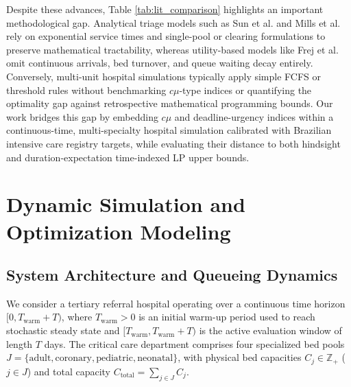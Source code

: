 \documentclass[final,5p,times,twocolumn]{elsarticle}
\begin{document}
Despite these advances, Table \ref{tab:lit_comparison} highlights an important methodological gap. Analytical triage models such as Sun et al. \cite{sun2018patient} and Mills et al. \cite{mills2013resource} rely on exponential service times and single-pool or clearing formulations to preserve mathematical tractability, whereas utility-based models like Frej et al. \cite{Frej_2023} omit continuous arrivals, bed turnover, and queue waiting decay entirely. Conversely, multi-unit hospital simulations typically apply simple FCFS or threshold rules without benchmarking $c\mu$-type indices or quantifying the optimality gap against retrospective mathematical programming bounds. Our work bridges this gap by embedding $c\mu$ and deadline-urgency indices within a continuous-time, multi-specialty hospital simulation calibrated with Brazilian intensive care registry targets, while evaluating their distance to both hindsight and duration-expectation time-indexed LP upper bounds.

\section{Dynamic Simulation and Optimization Modeling}
\label{sec:modeling}

\subsection{System Architecture and Queueing Dynamics}

We consider a tertiary referral hospital operating over a continuous time horizon $[0, T_{\text{warm}} + T)$, where $T_{\text{warm}} > 0$ is an initial warm-up period used to reach stochastic steady state and $[T_{\text{warm}}, T_{\text{warm}} + T)$ is the active evaluation window of length $T$ days. The critical care department comprises four specialized bed pools $J = \{\text{adult}, \text{coronary}, \text{pediatric}, \text{neonatal}\}$, with physical bed capacities $C_j \in \mathbb{Z}_+$ ($j \in J$) and total capacity $C_{\text{total}} = \sum_{j \in J} C_j$.
\end{document}
